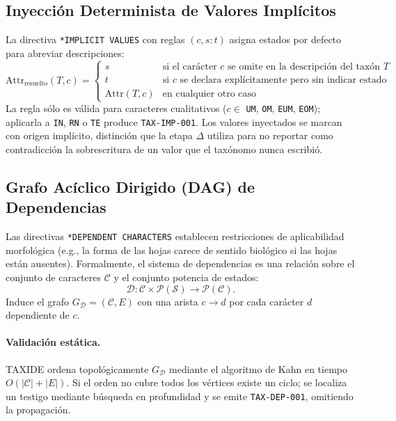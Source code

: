 \documentclass[11pt,a4paper]{article}
\theoremstyle{definition}
\theoremstyle{remark}
\begin{document}
\subsection{Inyección Determinista de Valores Implícitos}
\label{sec:implicitos}
La directiva \texttt{*IMPLICIT VALUES} con reglas $(c, s{:}t)$ asigna estados por defecto para abreviar descripciones:
\begin{equation}
\label{eq:implicitos}
\text{Attr}_{\text{resuelto}}(T, c) = \begin{cases}
s & \text{si el carácter $c$ se omite en la descripción del taxón $T$} \\
t & \text{si $c$ se declara explícitamente pero sin indicar estado} \\
\text{Attr}(T, c) & \text{en cualquier otro caso}
\end{cases}
\end{equation}
La regla sólo es válida para caracteres cualitativos ($c \in$ \texttt{UM}, \texttt{OM}, \texttt{EUM}, \texttt{EOM}); aplicarla a \texttt{IN}, \texttt{RN} o \texttt{TE} produce \texttt{TAX-IMP-001}. Los valores inyectados se marcan con origen implícito, distinción que la etapa $\Delta$ utiliza para no reportar como contradicción la sobrescritura de un valor que el taxónomo nunca escribió.

\subsection{Grafo Acíclico Dirigido (DAG) de Dependencias}
\label{sec:dag}
Las directivas \texttt{*DEPENDENT CHARACTERS} establecen restricciones de aplicabilidad morfológica (e.g., la forma de las hojas carece de sentido biológico si las hojas están ausentes). Formalmente, el sistema de dependencias es una relación sobre el conjunto de caracteres $\mathcal{C}$ y el conjunto potencia de estados:
\begin{equation}
\mathcal{D} \colon \mathcal{C} \times \mathcal{P}(\mathcal{S}) \to \mathcal{P}(\mathcal{C}).
\end{equation}
Induce el grafo $G_{\mathcal{D}} = (\mathcal{C}, E)$ con una arista $c \to d$ por cada carácter $d$ dependiente de $c$.

\paragraph{Validación estática.} TAXIDE ordena topológicamente $G_{\mathcal{D}}$ mediante el algoritmo de Kahn \cite{kahn1962} en tiempo $O(|\mathcal{C}| + |E|)$. Si el orden no cubre todos los vértices existe un ciclo; se localiza un testigo mediante búsqueda en profundidad y se emite \texttt{TAX-DEP-001}, omitiendo la propagación.
\end{document}
